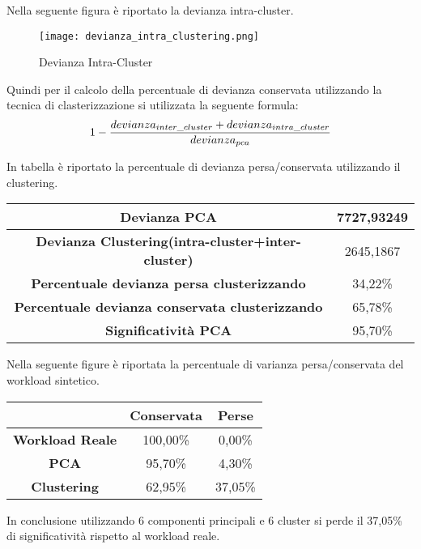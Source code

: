 Nella seguente figura è riportato la devianza intra-cluster.\\

\begin{figure}[!htbp]
	\texttt{[image: devianza\_intra\_clustering.png]}
  \caption{Devianza Intra-Cluster}
  \label{}
\end{figure}
\clearpage

Quindi per il calcolo della percentuale di devianza conservata utilizzando la
tecnica di clasterizzazione si utilizzata la seguente formula:
$$1-{devianza_{inter\_cluster}+devianza_{intra\_cluster}\over {devianza_{pca}}}$$

In tabella è riportato la percentuale di devianza persa/conservata utilizzando
il clustering.\\

\vspace{5 mm}

\begin{tabular}{|c|c|}
\hline
\textbf{Devianza PCA}	& 7727,93249 \\
\hline
\textbf{Devianza Clustering(intra-cluster+inter-cluster)}	& 2645,1867 \\
\hline
\textbf{Percentuale devianza persa clusterizzando}	& 34,22\% \\
\hline
\textbf{Percentuale devianza conservata clusterizzando}	& 65,78\% \\
\hline
\textbf{Significatività PCA} &	95,70\% \\
\hline
\end{tabular}

\vspace{5 mm}

Nella seguente figure è riportata la percentuale di varianza persa/conservata del
workload sintetico.\\

\vspace{5 mm}

\begin{tabular}{c|c|c|}
 & \textbf{Conservata} & \textbf{Perse} \\
 \hline
 \textbf{Workload Reale} & 100,00\% &	0,00\% \\
 \hline
 \textbf{PCA} &	95,70\%	& 4,30\% \\
 \hline
 \textbf{Clustering} &	62,95\%	& 37,05\% \\
 \hline
\end{tabular}

\vspace{5 mm}

In conclusione utilizzando 6 componenti principali e 6 cluster si perde il 37,05\%
di significatività rispetto al workload reale.

